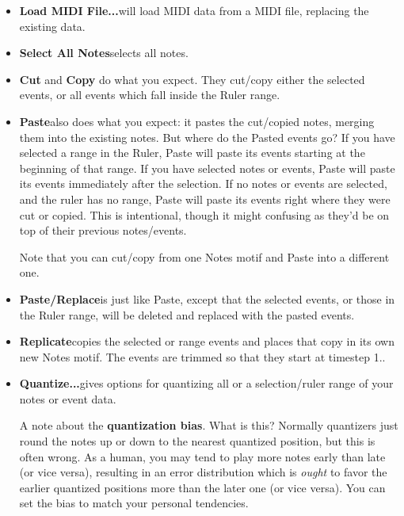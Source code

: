 \documentclass[twoside,10pt]{article}
\begin{document}
\begin{itemize}

\item{\bf Load MIDI File...}\quad will load MIDI data from a MIDI file, replacing the existing data.

\item{\bf Select All Notes}\quad selects all notes.

\item{\bf Cut} and {\bf Copy} do what you expect.  They cut/copy either the selected events, or all events which fall inside the Ruler range.

\item {\bf Paste}\quad also does what you expect: it pastes the cut/copied notes, merging them into the existing notes.  But where do the Pasted events go?  If you have selected a range in the Ruler, Paste will paste its events starting at the beginning of that range.  If you have selected notes or events, Paste will paste its events immediately after the selection.  If no notes or events are selected, and the ruler has no range, Paste will paste its events right where they were cut or copied.  This is intentional, though it might confusing as they'd be on top of their previous notes/events.

Note that you can cut/copy from one Notes motif and Paste into a different one.

\item {\bf Paste/Replace}\quad is just like Paste, except that the selected events, or those in the Ruler range, will be deleted and replaced with the pasted events.

\item {\bf Replicate}\quad copies the selected or range events and places that copy in its own new Notes motif.  The events are trimmed so that they start at timestep 1..

\item{\bf Quantize...}\quad gives options for quantizing all or a selection/ruler range of your notes or event data. 

 A note about  the {\bf quantization bias}.  What is this?  Normally quantizers just round the notes up or down to the nearest quantized position, but this is often wrong.  As a human, you may tend to play more notes early than late (or vice versa), resulting in an error distribution which is {\it ought} to favor the earlier quantized positions more than the later one (or vice versa).  You can set the bias to match your personal tendencies.


\end{itemize}
\end{document}
